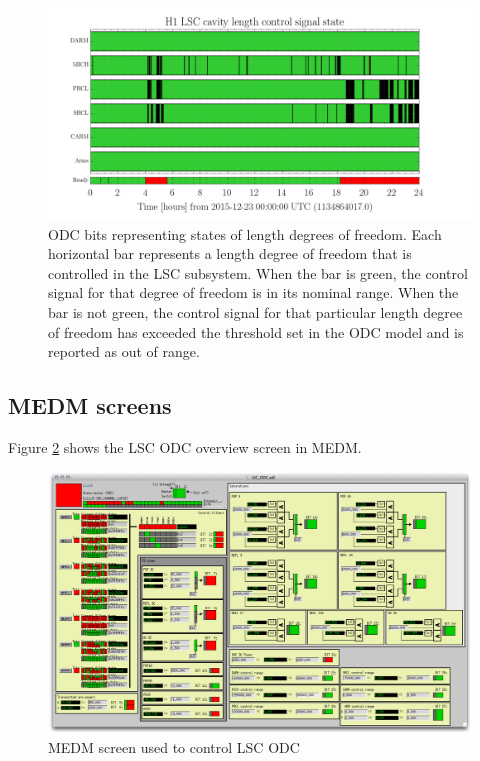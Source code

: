 \begin{figure}[ht!]
\includegraphics[width=\textwidth]{figures/ODC/LSC-bit-example}
\caption[LSC ODC bits example]{ODC bits representing states of length degrees of %
         freedom. Each horizontal bar represents a length degree of freedom that %
         is controlled in the LSC subsystem. When the bar is green, the control %
         signal for that degree of freedom is in its nominal range. When the %
         bar is not green, the control signal for that particular length degree %
         of freedom has exceeded the threshold set in the ODC model and is reported %
         as out of range.}
\label{fig:lsc-odc-bits}
\end{figure}

\subsection{MEDM screens}


Figure \ref{fig:lsc-odc} shows the LSC ODC overview screen in MEDM.

\begin{figure}[ht!]
\includegraphics[width=\textwidth]{figures/ODC/LSC_screen}
\caption[LSC ODC Overview Screen]{MEDM screen used to control LSC ODC}
\label{fig:lsc-odc}
\end{figure}

